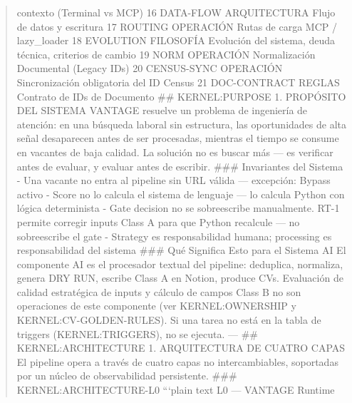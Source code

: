 \documentclass[
]{article}
\begin{document}
\begin{quote}
contexto (Terminal vs MCP) \textbar{} \textbar{} 16 \textbar{} DATA-FLOW
\textbar{} ARQUITECTURA \textbar{} Flujo de datos y escritura \textbar{}
\textbar{} 17 \textbar{} ROUTING \textbar{} OPERACIÓN \textbar{} Rutas
de carga MCP / lazy\_loader \textbar{} \textbar{} 18 \textbar{}
EVOLUTION \textbar{} FILOSOFÍA \textbar{} Evolución del sistema, deuda
técnica, criterios de cambio \textbar{} \textbar{} 19 \textbar{} NORM
\textbar{} OPERACIÓN \textbar{} Normalización Documental (Legacy IDs)
\textbar{} \textbar{} 20 \textbar{} CENSUS-SYNC \textbar{} OPERACIÓN
\textbar{} Sincronización obligatoria del ID Census \textbar{}
\textbar{} 21 \textbar{} DOC-CONTRACT \textbar{} REGLAS \textbar{}
Contrato de IDs de Documento \textbar{} \#\# KERNEL:PURPOSE 1. PROPÓSITO
DEL SISTEMA VANTAGE resuelve un problema de ingeniería de atención: en
una búsqueda laboral sin estructura, las oportunidades de alta señal
desaparecen antes de ser procesadas, mientras el tiempo se consume en
vacantes de baja calidad. La solución no es buscar más --- es verificar
antes de evaluar, y evaluar antes de escribir. \#\#\# Invariantes del
Sistema - Una vacante no entra al pipeline sin URL válida --- excepción:
Bypass activo - Score no lo calcula el sistema de lenguaje --- lo
calcula Python con lógica determinista - Gate decision no se
sobreescribe manualmente. RT-1 permite corregir inputs Class A para que
Python recalcule --- no sobreescribe el gate - Strategy es
responsabilidad humana; processing es responsabilidad del sistema \#\#\#
Qué Significa Esto para el Sistema AI El componente AI es el procesador
textual del pipeline: deduplica, normaliza, genera DRY RUN, escribe
Class A en Notion, produce CVs. Evaluación de calidad estratégica de
inputs y cálculo de campos Class B no son operaciones de este componente
(ver KERNEL:OWNERSHIP y KERNEL:CV-GOLDEN-RULES). Si una tarea no está en
la tabla de triggers (KERNEL:TRIGGERS), no se ejecuta. --- \#\#
KERNEL:ARCHITECTURE 1. ARQUITECTURA DE CUATRO CAPAS El pipeline opera a
través de cuatro capas no intercambiables, soportadas por un núcleo de
observabilidad persistente. \#\#\# KERNEL:ARCHITECTURE-L0 ```plain text
L0 --- VANTAGE Runtime
\end{quote}
\end{document}
